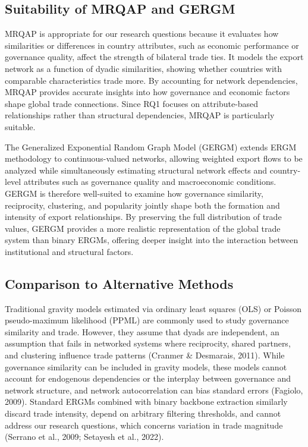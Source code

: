 \documentclass[
]{article}
\begin{document}
\subsection{Suitability of MRQAP and
GERGM}\label{suitability-of-mrqap-and-gergm}

MRQAP is appropriate for our research questions because it evaluates how
similarities or differences in country attributes, such as economic
performance or governance quality, affect the strength of bilateral
trade ties. It models the export network as a function of dyadic
similarities, showing whether countries with comparable characteristics
trade more. By accounting for network dependencies, MRQAP provides
accurate insights into how governance and economic factors shape global
trade connections. Since RQ1 focuses on attribute-based relationships
rather than structural dependencies, MRQAP is particularly suitable.

The Generalized Exponential Random Graph Model (GERGM) extends ERGM
methodology to continuous-valued networks, allowing weighted export
flows to be analyzed while simultaneously estimating structural network
effects and country-level attributes such as governance quality and
macroeconomic conditions. GERGM is therefore well-suited to examine how
governance similarity, reciprocity, clustering, and popularity jointly
shape both the formation and intensity of export relationships. By
preserving the full distribution of trade values, GERGM provides a more
realistic representation of the global trade system than binary ERGMs,
offering deeper insight into the interaction between institutional and
structural factors.

\subsection{Comparison to Alternative
Methods}\label{comparison-to-alternative-methods}

Traditional gravity models estimated via ordinary least squares (OLS) or
Poisson pseudo-maximum likelihood (PPML) are commonly used to study
governance similarity and trade. However, they assume that dyads are
independent, an assumption that fails in networked systems where
reciprocity, shared partners, and clustering influence trade patterns
(Cranmer \& Desmarais, 2011). While governance similarity can be
included in gravity models, these models cannot account for endogenous
dependencies or the interplay between governance and network structure,
and network autocorrelation can bias standard errors (Fagiolo, 2009).
Standard ERGMs combined with binary backbone extraction similarly
discard trade intensity, depend on arbitrary filtering thresholds, and
cannot address our research questions, which concerns variation in trade
magnitude (Serrano et al., 2009; Setayesh et al., 2022).
\end{document}

